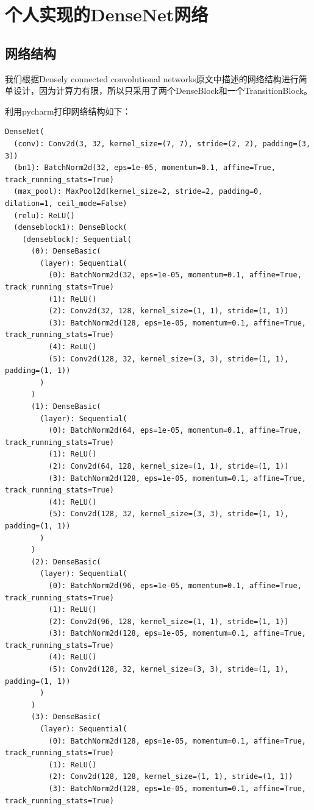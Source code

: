 \documentclass{article}
\begin{document}
\section{个人实现的DenseNet网络}
\subsection{网络结构}
我们根据Densely connected convolutional networks原文中描述的网络结构进行简单设计，因为计算力有限，所以只采用了两个DenseBlock和一个TransitionBlock。

\noindent 利用pycharm打印网络结构如下：
\begin{lstlisting}
DenseNet(
  (conv): Conv2d(3, 32, kernel_size=(7, 7), stride=(2, 2), padding=(3, 3))
  (bn1): BatchNorm2d(32, eps=1e-05, momentum=0.1, affine=True, track_running_stats=True)
  (max_pool): MaxPool2d(kernel_size=2, stride=2, padding=0, dilation=1, ceil_mode=False)
  (relu): ReLU()
  (denseblock1): DenseBlock(
    (denseblock): Sequential(
      (0): DenseBasic(
        (layer): Sequential(
          (0): BatchNorm2d(32, eps=1e-05, momentum=0.1, affine=True, track_running_stats=True)
          (1): ReLU()
          (2): Conv2d(32, 128, kernel_size=(1, 1), stride=(1, 1))
          (3): BatchNorm2d(128, eps=1e-05, momentum=0.1, affine=True, track_running_stats=True)
          (4): ReLU()
          (5): Conv2d(128, 32, kernel_size=(3, 3), stride=(1, 1), padding=(1, 1))
        )
      )
      (1): DenseBasic(
        (layer): Sequential(
          (0): BatchNorm2d(64, eps=1e-05, momentum=0.1, affine=True, track_running_stats=True)
          (1): ReLU()
          (2): Conv2d(64, 128, kernel_size=(1, 1), stride=(1, 1))
          (3): BatchNorm2d(128, eps=1e-05, momentum=0.1, affine=True, track_running_stats=True)
          (4): ReLU()
          (5): Conv2d(128, 32, kernel_size=(3, 3), stride=(1, 1), padding=(1, 1))
        )
      )
      (2): DenseBasic(
        (layer): Sequential(
          (0): BatchNorm2d(96, eps=1e-05, momentum=0.1, affine=True, track_running_stats=True)
          (1): ReLU()
          (2): Conv2d(96, 128, kernel_size=(1, 1), stride=(1, 1))
          (3): BatchNorm2d(128, eps=1e-05, momentum=0.1, affine=True, track_running_stats=True)
          (4): ReLU()
          (5): Conv2d(128, 32, kernel_size=(3, 3), stride=(1, 1), padding=(1, 1))
        )
      )
      (3): DenseBasic(
        (layer): Sequential(
          (0): BatchNorm2d(128, eps=1e-05, momentum=0.1, affine=True, track_running_stats=True)
          (1): ReLU()
          (2): Conv2d(128, 128, kernel_size=(1, 1), stride=(1, 1))
          (3): BatchNorm2d(128, eps=1e-05, momentum=0.1, affine=True, track_running_stats=True)

\end{lstlisting}
\end{document}
